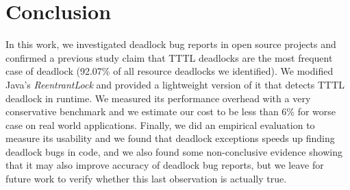 \section{Conclusion}

In this work, we investigated deadlock bug reports in open source projects and
confirmed a previous study claim that TTTL deadlocks
are the most frequent case of deadlock (92.07\% of all resource deadlocks we identified).
We modified Java's \emph{ReentrantLock} and provided a lightweight
version of it that detects TTTL deadlock in runtime.
We measured its performance overhead with a very conservative benchmark
and we estimate our cost to be less than 6\% for worse case on real world applications.
Finally, we did an empirical evaluation to measure its usability and we found that
deadlock exceptions speeds up finding deadlock bugs in code, and we also found some
non-conclusive evidence showing that it may also improve accuracy of deadlock bug reports,
but we leave for future work to verify whether this last observation is actually true.